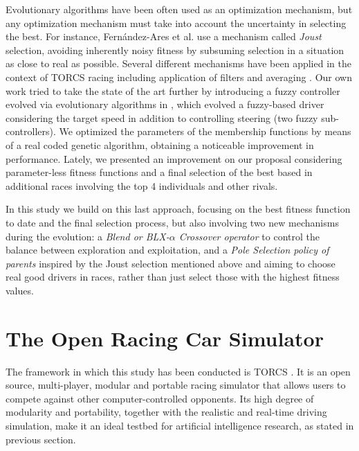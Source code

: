 \documentclass[conference]{IEEEtran}
\begin{document}
Evolutionary algorithms have been often used as an optimization
mechanism, but any optimization mechanism must take into account the
uncertainty in selecting the best. For instance, Fern\'andez-Ares et
al. \cite{DBLP:conf/evoW/Fernandez-AresG16} use a mechanism called
{\em Joust} selection, avoiding inherently noisy fitness by subsuming
selection in a situation as close to real as possible. Several
different mechanisms have been applied in the context of TORCS racing
including application of filters \cite{preuss2011torcs} and averaging
\cite{Shi-DE13}.
Our own work tried to take the state of the art further by introducing
a fuzzy controller evolved via evolutionary algorithms in
\cite{salem_evo18}, which evolved a fuzzy-based driver considering the
target speed in addition to controlling steering (two fuzzy
sub-controllers). We optimized the parameters of the membership functions by means of a real coded genetic algorithm, obtaining a noticeable improvement in
performance. Lately, we presented \cite{salem_cig2018} an improvement on our proposal considering parameter-less fitness functions and a final selection of the best based in additional races involving the top 4 individuals and other rivals.

In this study we build on this last approach, focusing on the best
fitness function to date and the final selection process, but also
involving two new mechanisms during the evolution: a \textit{Blend or BLX-$\alpha$ Crossover operator} to control the balance between exploration and
exploitation, and a \textit{Pole Selection policy of parents} inspired by the
Joust selection mentioned above and aiming to choose real good drivers in races, rather than just select those with the highest fitness values. 



\section{The Open Racing Car Simulator}
\label{sec:torcs}

The framework in which this study has been conducted is TORCS \cite{torcs4}. It is an open source, multi-player, modular and portable racing simulator that allows users to compete against other computer-controlled opponents.
Its high degree of modularity and portability, together with the
realistic and real-time driving simulation, make it an ideal testbed
for artificial intelligence research, as stated in previous section.
\end{document}
